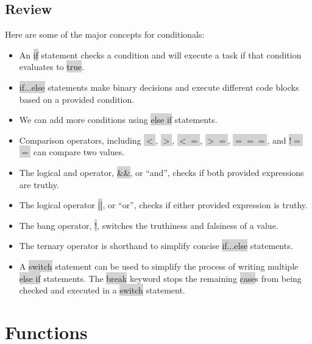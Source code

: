 \documentclass[11pt]{article}
\begin{document}
\subsection{Review}
Here are some of the major concepts for conditionals:
\begin{itemize}[leftmargin = *]
\item An \colorbox{lightgray}{if} statement checks a condition and will execute a task if that condition evaluates to \colorbox{lightgray}{true}.
\item \colorbox{lightgray}{if...else} statements make binary decisions and execute different code blocks based on a provided condition.
\item We can add more conditions using \colorbox{lightgray}{else if} statements.
\item Comparison operators, including \colorbox{lightgray}{$<$}, \colorbox{lightgray}{$>$}, \colorbox{lightgray}{$<$$=$}, \colorbox{lightgray}{$>$$=$}, \colorbox{lightgray}{$=$$=$$=$}, and \colorbox{lightgray}{$!$$=$$=$} can compare two values.
\item The logical and operator, \colorbox{lightgray}{\&\&}, or “and”, checks if both provided expressions are truthy.
\item The logical operator \colorbox{lightgray}{||}, or “or”, checks if either provided expression is truthy.
\item The bang operator, \colorbox{lightgray}{!}, switches the truthiness and falsiness of a value.
\item The ternary operator is shorthand to simplify concise \colorbox{lightgray}{if...else} statements.
\item A \colorbox{lightgray}{switch} statement can be used to simplify the process of writing multiple \colorbox{lightgray}{else if} statements. The \colorbox{lightgray}{break} keyword stops the remaining \colorbox{lightgray}{case}s from being checked and executed in a \colorbox{lightgray}{switch} statement.
\end{itemize}

\newpage
\section{Functions}
\end{document}
